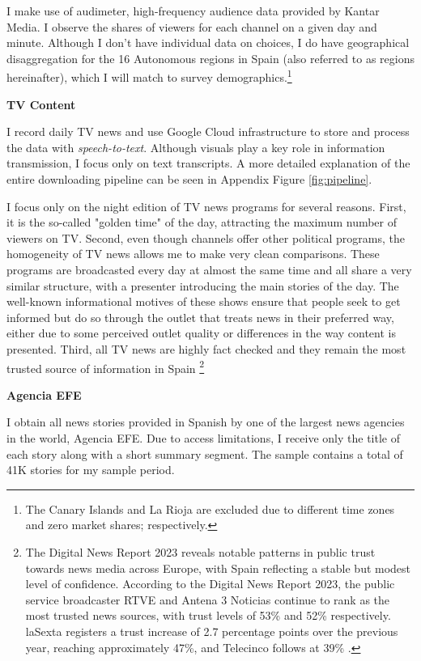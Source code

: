 \documentclass[12pt]{article}
\begin{document}
	
	I make use of audimeter, high-frequency audience data provided by Kantar Media.  I  observe the shares of viewers for each channel on a given day and minute. Although I don't have individual data on choices, I do have geographical disaggregation for the 16 Autonomous regions in Spain (also referred to as regions hereinafter), which I will match to survey demographics.\footnote{The Canary Islands and La Rioja are excluded due to different time zones and zero market shares; respectively.}

	
	\textbf{TV Content}
	
	I record daily TV news and use Google Cloud infrastructure to store and process the data with \textit{speech-to-text}. Although visuals play a key role in information transmission, I focus only on text transcripts. A more detailed explanation of the entire downloading pipeline can be seen in Appendix Figure \ref{fig:pipeline}.
	
	
	
	I focus only on the night edition of TV news programs for several reasons. First, it is the so-called "golden time" of the day, attracting the maximum number of viewers on TV. Second, even though channels offer other political programs, the homogeneity of TV news allows me to make very clean comparisons. These programs are broadcasted every day at almost the same time and all share a very similar structure, with a presenter introducing the main stories of the day. The well-known informational motives of these shows ensure that people seek to get informed but do so through the outlet that treats news in their preferred way, either due to some perceived outlet quality or differences in the way content is presented. Third, all TV news are highly fact checked and they remain the most trusted source of information in Spain \footnote{The Digital News Report 2023 reveals notable patterns in public trust towards news media across Europe, with Spain reflecting a stable but modest level of confidence. According to the Digital News Report 2023, the public service broadcaster RTVE and Antena 3 Noticias continue to rank as the most trusted news sources, with trust levels of 53\% and 52\% respectively. laSexta registers a trust increase of 2.7 percentage points over the previous year, reaching approximately 47\%, and Telecinco follows at 39\% \citep{reuters_dnr_2023}.}
	
	
	
	
	\textbf{Agencia EFE}
	
	I obtain all news stories provided in Spanish by one of the largest news agencies in the world, Agencia EFE. Due to access limitations, I receive only the title of each story along with a short summary segment. The sample contains a total of 41K stories for my sample period. 
	
\end{document}
